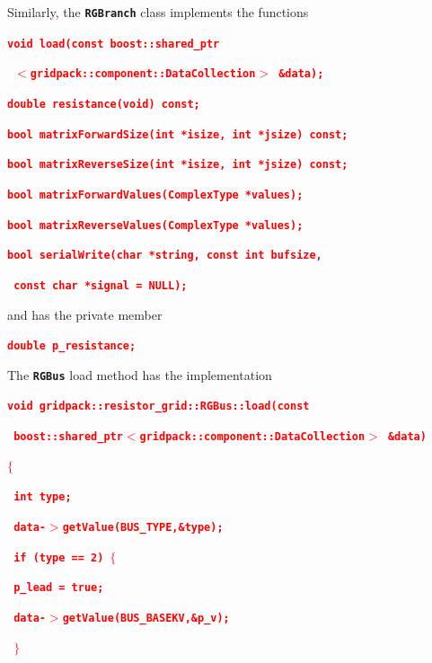 \documentclass[12pt]{report} %
\begin{document}
Similarly, the \texttt{\textbf{RGBranch}} class implements the functions

\textcolor{red}{\texttt{\textbf{void load(const boost::shared\_ptr}}}

\textcolor{red}{\texttt{\textbf{  $\boldsymbol{\mathrm{<}}$gridpack::component::DataCollection$\boldsymbol{\mathrm{>}}$ \&data);}}}

\textcolor{red}{\texttt{\textbf{double resistance(void) const;}}}

\textcolor{red}{\texttt{\textbf{bool matrixForwardSize(int *isize, int *jsize) const;}}}

\textcolor{red}{\texttt{\textbf{bool matrixReverseSize(int *isize, int *jsize) const;}}}

\textcolor{red}{\texttt{\textbf{bool matrixForwardValues(ComplexType *values);}}}

\textcolor{red}{\texttt{\textbf{bool matrixReverseValues(ComplexType *values);}}}

\textcolor{red}{\texttt{\textbf{bool serialWrite(char *string, const int bufsize,}}}

\textcolor{red}{\texttt{\textbf{  const char *signal = NULL);}}}

and has the private member

\textcolor{red}{\texttt{\textbf{double p\_resistance;}}}

The \texttt{\textbf{RGBus}} load method has the implementation

\textcolor{red}{\texttt{\textbf{void gridpack::resistor\_grid::RGBus::load(const}}}

\textcolor{red}{\texttt{\textbf{         boost::shared\_ptr$\boldsymbol{\mathrm{<}}$gridpack::component::DataCollection$\boldsymbol{\mathrm{>}}$ \&data)}}}

\textcolor{red}{\texttt{\textbf{$\boldsymbol{\mathrm{\{}}$}}}

\textcolor{red}{\texttt{\textbf{   int type;}}}

\textcolor{red}{\texttt{\textbf{   data-$\boldsymbol{\mathrm{>}}$getValue(BUS\_TYPE,\&type);}}}

\textcolor{red}{\texttt{\textbf{   if (type == 2) $\boldsymbol{\mathrm{\{}}$}}}

\textcolor{red}{\texttt{\textbf{     p\_lead = true;}}}

\textcolor{red}{\texttt{\textbf{     data-$\boldsymbol{\mathrm{>}}$getValue(BUS\_BASEKV,\&p\_v);}}}

\textcolor{red}{\texttt{\textbf{   $\boldsymbol{\mathrm{\}}}$}}}
\end{document}
